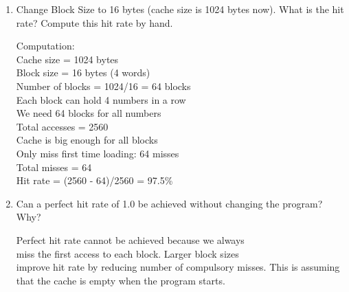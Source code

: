 \documentclass{article}\\
\begin{document}
\begin{enumerate}
    \item Change Block Size to 16 bytes (cache size is 1024 bytes now). What is the hit rate? Compute this hit rate by hand.
    
    Computation:\\
    Cache size = 1024 bytes\\
    Block size = 16 bytes (4 words)\\
    Number of blocks = 1024/16 = 64 blocks\\
    Each block can hold 4 numbers in a row\\
    We need 64 blocks for all numbers\\
    Total accesses = 2560\\
    Cache is big enough for all blocks\\
    Only miss first time loading: 64 misses\\
    Total misses = 64\\
    Hit rate = (2560 - 64)/2560 = 97.5\%

    \item Can a perfect hit rate of 1.0 be achieved without changing the program? Why?
    
    Perfect hit rate cannot be achieved because we always \\
    miss the first access to each block. Larger block sizes\\
    improve hit rate by reducing number of compulsory misses. This is assuming \\
    that the cache is empty when the program starts.

\end{enumerate}
\end{document}
